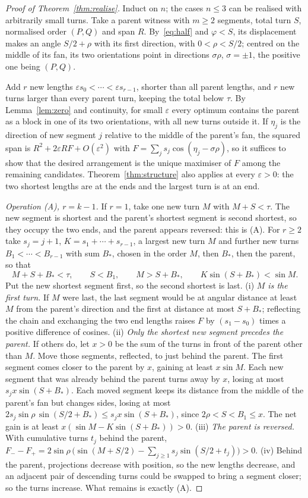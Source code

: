 \documentclass[11pt]{article}
\theoremstyle{remark}
\begin{document}
\begin{proof}[Proof of Theorem~\ref{thm:realise}]
Induct on $n$; the cases $n\le3$ can be realised with arbitrarily small turns. Take a parent witness with $m\ge2$ segments, total turn $S$, normalised order $(P,Q)$ and span $R$. By~\eqref{eq:half} and $\varphi<S$, its displacement makes an angle $S/2+\rho$ with its first direction, with $0<\rho<S/2$; centred on the middle of its fan, its two orientations point in directions $\sigma\rho$, $\sigma=\pm1$, the positive one being $(P,Q)$.

Add $r$ new lengths $\varepsilon s_0<\cdots<\varepsilon s_{r-1}$, shorter than all parent lengths, and $r$ new turns larger than every parent turn, keeping the total below $\tau$. By Lemma~\ref{lem:zero} and continuity, for small $\varepsilon$ every optimum contains the parent as a block in one of its two orientations, with all new turns outside it. If $\eta_j$ is the direction of new segment $j$ relative to the middle of the parent's fan, the squared span is $R^2+2\varepsilon RF+O(\varepsilon^2)$ with $F=\sum_j s_j\cos(\eta_j-\sigma\rho)$, so it suffices to show that the desired arrangement is the unique maximiser of $F$ among the remaining candidates. Theorem~\ref{thm:structure} also applies at every $\varepsilon>0$: the two shortest lengths are at the ends and the largest turn is at an end.

\emph{Operation (A), $r=k-1$.} If $r=1$, take one new turn $M$ with $M+S<\tau$. The new segment is shortest and the parent's shortest segment is second shortest, so they occupy the two ends, and the parent appears reversed: this is (A). For $r\ge2$ take $s_j=j+1$, $K=s_1+\cdots+s_{r-1}$, a largest new turn $M$ and further new turns $B_1<\cdots<B_{r-1}$ with sum $B_*$, chosen in the order $M$, then $B_*$, then the parent, so that
\[
M+S+B_*<\tau,\qquad S<B_1,\qquad M>S+B_*,\qquad K\sin(S+B_*)<\sin M .
\]
Put the new shortest segment first, so the second shortest is last.
(i) \emph{$M$ is the first turn.} If $M$ were last, the last segment would be at angular distance at least $M$ from the parent's direction and the first at distance at most $S+B_*$; reflecting the chain and exchanging the two end lengths raises $F$ by $(s_1-s_0)$ times a positive difference of cosines.
(ii) \emph{Only the shortest new segment precedes the parent.} If others do, let $x>0$ be the sum of the turns in front of the parent other than $M$. Move those segments, reflected, to just behind the parent. The first segment comes closer to the parent by $x$, gaining at least $x\sin M$. Each new segment that was already behind the parent turns away by $x$, losing at most $s_jx\sin(S+B_*)$. Each moved segment keeps its distance from the middle of the parent's fan but changes sides, losing at most $2s_j\sin\rho\,\sin(S/2+B_*)\le s_jx\sin(S+B_*)$, since $2\rho<S<B_1\le x$. The net gain is at least $x(\sin M-K\sin(S+B_*))>0$.
(iii) \emph{The parent is reversed.} With cumulative turns $t_j$ behind the parent, $F_--F_+=2\sin\rho\,\bigl(\sin(M+S/2)-\sum_{j\ge1}s_j\sin(S/2+t_j)\bigr)>0$.
(iv) Behind the parent, projections decrease with position, so the new lengths decrease, and an adjacent pair of descending turns could be swapped to bring a segment closer; so the turns increase. What remains is exactly (A).


\end{proof}
\end{document}
